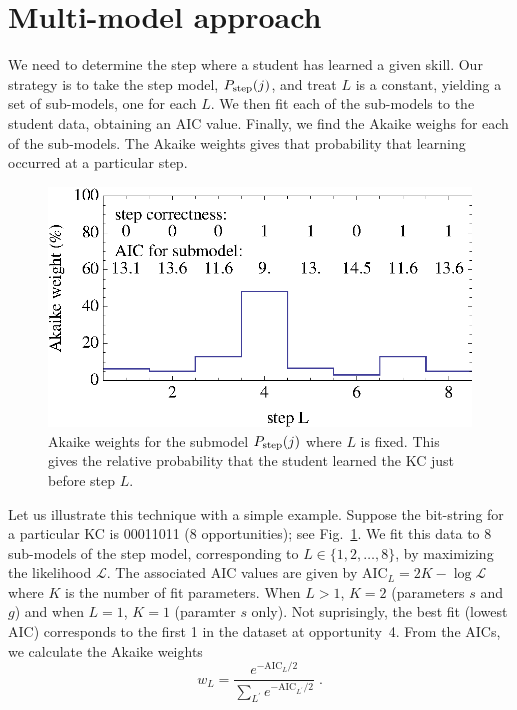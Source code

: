\documentclass[11pt,letterpaper]{article}
\begin{document}
\section{Multi-model approach}
\label{multi-model}

We need to determine the step where a student has learned a given
skill.  Our strategy is to take the step model, $P_{\rm step}(j)$, 
and treat $L$ is a constant, yielding a set of sub-models, one for each $L$.
We then fit each of the sub-models to the student data, obtaining an
AIC value.  Finally, we find the Akaike weighs for each of the
sub-models.  The Akaike weights gives that probability that learning
occurred at a particular step.

\begin{figure}
  \centering \includegraphics{step-weights.eps}
   \caption{Akaike weights for the submodel $P_{\rm step}(j)$
      where $L$ is fixed.  This gives the relative probability that
      the student learned the KC just before step $L$.}
    \label{step-weights}
\end{figure}

Let us illustrate this technique with a simple example. 
 Suppose the bit-string for a particular KC is 00011011 (8 opportunities); see
Fig.~\ref{step-weights}.
We fit this data to 8 sub-models of the step model, corresponding to
$L\in\{1,2,\ldots,8\}$, by maximizing the likelihood $\mathcal{L}$.  
The associated AIC values are
given by $\mathrm{AIC}_L=2 K-\log \mathcal{L}$  where $K$ is the
number of fit parameters.  When $L>1$, $K=2$  (parameters $s$ and $g$) and 
when $L=1$, $K=1$ (paramter $s$ only).
%
%
Not suprisingly, the best fit (lowest AIC) corresponds to the first
1 in the dataset at opportunity~4.  From the AICs, we calculate the Akaike weights
%
\begin{equation}
     w_L=\frac{e^{-\mathrm{AIC}_L/2} }{\sum_{L^\prime}
       e^{-\mathrm{AIC}_{L^\prime}/2}} \; .
\end{equation}
%
\end{document}
